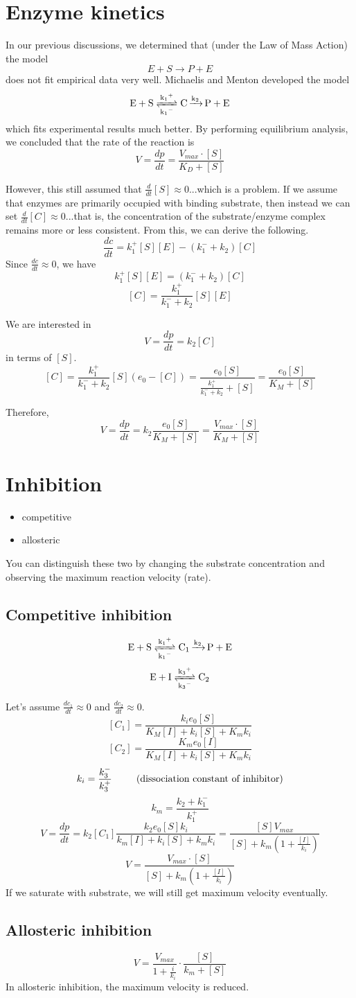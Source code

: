 \documentclass[10pt]{article}
\newenvironment{mitemize}
{
  \begin{itemize}
  \setlength{\itemsep}{1pt}
  \setlength{\parskip}{0pt}
  \setlength{\parsep}{0pt}}{\end{itemize}
}
\begin{document}
\section*{Enzyme kinetics}
In our previous discussions, we determined that (under the Law of Mass Action) the model \[ E + S \rightarrow P + E \] does not fit empirical data very well. 
Michaelis and Menton developed the model \[ \ce{E + S <=>[\ce{k_1^{+}}][k_1^{-}] C \xrightarrow{k_2} P + E} \] which fits experimental results much better.
By performing equilibrium analysis, we concluded that the rate of the reaction is \[ V = \frac{dp}{dt} = \frac{V_{max}\cdot [S]}{K_D + [S]} \]

However, this still assumed that $ \frac{d}{dt}[S] \approx 0 $...which is a problem.
If we assume that enzymes are primarily occupied with binding substrate, then instead we can set $ \frac{d}{dt}[C] \approx 0 $...that is, the concentration of the substrate/enzyme complex remains more or less consistent.
From this, we can derive the following.
\[ \frac{dc}{dt} = k_1^{+}[S][E] - (k_1^{-} + k_2)[C] \]
Since $\frac{dc}{dt} \approx 0$, we have
\[ k_1^{+}[S][E] = (k_1^{-} + k_2)[C] \]
\[ [C] = \frac{k_1^{+}}{k_1^{-} + k_2}[S][E] \]

We are interested in \[ V = \frac{dp}{dt} = k_2 [C] \] in terms of $[S]$.
\[ [C] = \frac{k_1^{+}}{k_1^{-} + k_2}[S](e_0 - [C]) = \frac{e_0[S]}{\frac{k_1^{+}}{k_1^{-} + k_2} + [S]} = \frac{e_0[S]}{K_M + [S]} \]

Therefore, \[ V = \frac{dp}{dt} = k_2\frac{e_0[S]}{K_M + [S]} = \frac{V_{max} \cdot [S]}{K_M + [S]} \]

\section*{Inhibition}
\begin{mitemize}
  \item competitive
  \item allosteric
\end{mitemize}
You can distinguish these two by changing the substrate concentration and observing the maximum reaction velocity (rate).

\subsection*{Competitive inhibition}
\[ \ce{E + S <=>[\ce{k_1^{+}}][k_1^{-}] C_1 \xrightarrow{k_2} P + E} \]
\[ \ce{E + I <=>[\ce{k_3^{+}}][k_3^{-}] C_2} \]

Let's assume $\frac{dc_1}{dt} \approx 0$ and $\frac{dc_2}{dt} \approx 0$.
\[ [C_1] = \frac{k_i e_0 [S]}{K_M [I] + k_i [S] + K_m k_i} \]
\[ [C_2] = \frac{K_m e_0 [I]}{K_M [I] + k_i [S] + K_m k_i} \]
\[ k_i = \frac{k_3^{-}}{k_3^{+}} \text{\hspace{25px}(dissociation constant of inhibitor)} \]
\[ k_m = \frac{k_2 + k_1^{-}}{k_1^{+}} \]
\[ V = \frac{dp}{dt} = k_2 [C_1]\frac{k_2 e_0 [S] k_i}{k_m [I] + k_i [S] + k_m k_i} = \frac{[S] V_{max}}{[S] + k_m\left(1 + \frac{[I]}{k_i}\right)} \]
\[ V = \frac{V_{max} \cdot [S]}{[S] + k_m\left(1 + \frac{[I]}{k_i}\right)} \]
If we saturate with substrate, we will still get maximum velocity eventually.

\subsection*{Allosteric inhibition}
\[ V = \frac{V_{max}}{1 + \frac{i}{k_i}}\cdot\frac{[S]}{k_m + [S]} \]
In allosteric inhibition, the maximum velocity is reduced.
\end{document}
